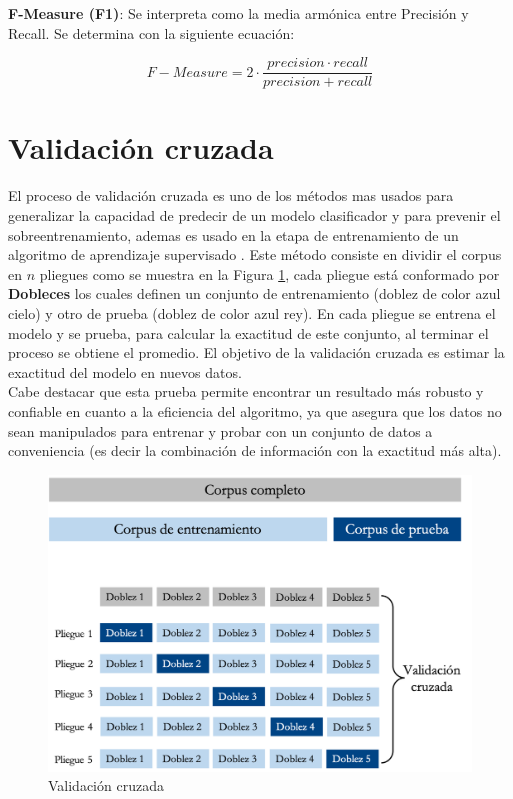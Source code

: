 \textbf{F-Measure (F1)}: Se interpreta como la media armónica entre Precisión y Recall. Se determina
con la siguiente ecuación:

\begin{equation}\label{eq:3}
	 F-Measure = 2 \cdot \frac{precision \cdot recall}{precision+recall}
\end{equation}


\section{Validación cruzada}


El proceso de validación cruzada es uno de los métodos mas usados para generalizar la capacidad de predecir de un modelo clasificador y para prevenir el sobre\-entrenamiento, ademas es usado en la etapa de entrenamiento de un algoritmo de aprendizaje supervisado \citep{CTValidacionC}. Este método consiste en dividir el corpus en $n$ pliegues como se muestra en la Figura \ref{cp3:diagramacv}, cada pliegue está conformado por \textbf{Dobleces} los cuales definen un conjunto de entrenamiento (doblez de color azul cielo) y otro de prueba (doblez de color azul rey). En cada pliegue se entrena el modelo y se prueba, para calcular la exactitud de este conjunto, al terminar el proceso se obtiene el promedio. El objetivo de la validación cruzada es estimar la exactitud del modelo en nuevos datos.\\

Cabe destacar que esta prueba permite encontrar un resultado más robusto y confiable en cuanto a la eficiencia del algoritmo, ya que asegura que los datos no sean manipulados para entrenar y probar con un conjunto de datos a conveniencia (es decir la combinación de información con la exactitud más alta).


\begin{figure}[h]
\centering
\includegraphics[scale=.6]{imagenes/Capitulo3/validacionc.png}
\caption{Validación cruzada}
\label{cp3:diagramacv}
\end{figure}

